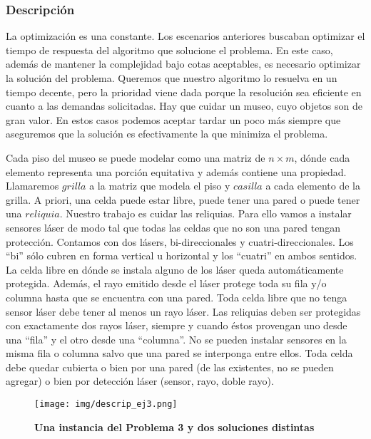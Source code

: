\documentclass[11pt, a4paper, twoside]{article}
\begin{document}
{}

\subsubsection{Descripción}

La optimización es una constante. Los escenarios anteriores buscaban optimizar
el tiempo de respuesta del algoritmo que solucione el problema. En este caso,
además de mantener la complejidad bajo cotas aceptables, es necesario optimizar
la solución del problema. Queremos que nuestro algoritmo lo resuelva en un
tiempo decente, pero la prioridad viene dada porque la resolución sea eficiente
en cuanto a las demandas solicitadas. Hay que cuidar un museo, cuyo objetos
son de gran valor. En estos casos podemos aceptar tardar un poco más siempre
que aseguremos que la solución es efectivamente la que minimiza el problema.

Cada piso del museo se puede modelar como una matriz de $n \times m$, dónde
cada elemento representa una porción equitativa y además contiene una propiedad.
Llamaremos $grilla$ a la matriz que modela el piso y $casilla$ a cada elemento
de la grilla. A priori, una celda puede estar libre, puede tener una pared
o puede tener una $reliquia$. Nuestro trabajo es cuidar las reliquias.
Para ello vamos a instalar sensores láser de modo tal que todas las celdas
que no son una pared tengan protección. Contamos con dos lásers, bi-direccionales
y cuatri-direccionales. Los \enquote{bi} sólo cubren en forma vertical u horizontal
y los \enquote{cuatri} en ambos sentidos. La celda libre en dónde se instala alguno
de los láser queda automáticamente protegida. Además, el rayo emitido desde el láser
protege toda su fila y/o columna hasta que se encuentra con una pared. Toda celda
libre que no tenga sensor láser debe tener al menos un rayo láser. Las reliquias
deben ser protegidas con exactamente dos rayos láser, siempre y cuando éstos
provengan uno desde una \enquote{fila} y el otro desde una \enquote{columna}.
No se pueden instalar sensores en la misma fila o columna salvo que una pared
se interponga entre ellos. Toda celda debe quedar cubierta o bien por 
una pared (de las existentes, no se pueden agregar) o bien por detección láser (sensor, rayo, doble rayo).

\begin{center}
\begin{figure}[H]
   \begin{center}
   \texttt{[image: img/descrip\_ej3.png]}
   \caption{\textbf{Una instancia del Problema 3 y dos soluciones distintas}}
   \label{fig:ej3-descrip}
   \end{center}
\end{figure}
\end{center}
\end{document}
